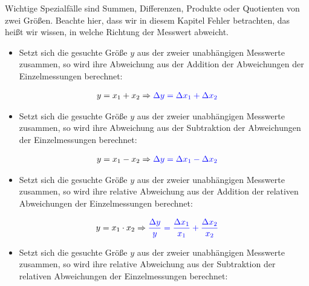 \documentclass[letterpaper,10pt,english]{jupyterBook}
\begin{document}
\sphinxAtStartPar
Wichtige Spezialfälle sind Summen, Differenzen, Produkte oder Quotienten von zwei Größen. Beachte hier, dass wir in diesem Kapitel Fehler  betrachten, das heißt wir wissen, in welche Richtung der Messwert abweicht.
\begin{itemize}
\item {} 
\sphinxAtStartPar
Setzt sich die gesuchte Größe \(y\) aus der  zweier unabhängigen Messwerte zusammen, so wird ihre Abweichung aus der Addition der Abweichungen der Einzelmessungen berechnet:

\end{itemize}
\begin{equation*}
\begin{split}y=x_1 + x_2 \Rightarrow  \color{blue}{
   \Delta y =  \Delta x_1 + \Delta x_2 } \end{split}
\end{equation*}\begin{itemize}
\item {} 
\sphinxAtStartPar
Setzt sich die gesuchte Größe \(y\) aus der  zweier unabhängigen Messwerte zusammen, so wird ihre Abweichung aus der Subtraktion der Abweichungen der Einzelmessungen berechnet:

\end{itemize}
\begin{equation*}
\begin{split}y=x_1 - x_2 \Rightarrow  \color{blue}{
   \Delta y =  \Delta x_1 - \Delta x_2 } \end{split}
\end{equation*}\begin{itemize}
\item {} 
\sphinxAtStartPar
Setzt sich die gesuchte Größe \(y\) aus der  zweier unabhängigen Messwerte zusammen, so wird ihre relative Abweichung aus der Addition der relativen Abweichungen der Einzelmessungen berechnet:

\end{itemize}
\begin{equation*}
\begin{split}y=x_1 \cdot x_2 \Rightarrow  \color{blue}{
   \frac{\Delta y}{y} =  \frac{\Delta x_1}{x_1} + \frac{\Delta x_2}{x_2} }\end{split}
\end{equation*}\begin{itemize}
\item {} 
\sphinxAtStartPar
Setzt sich die gesuchte Größe \(y\) aus der  zweier unabhängigen Messwerte zusammen, so wird ihre relative Abweichung aus der Subtraktion der relativen Abweichungen der Einzelmessungen berechnet:

\end{itemize}
\end{document}
